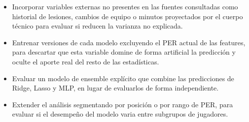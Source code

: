 \documentclass[11pt,a4paper]{article}
\begin{document}
\begin{itemize}[leftmargin=*, itemsep=4pt]
    \item Incorporar variables externas no presentes en las fuentes consultadas como historial de lesiones, cambios de equipo o minutos proyectados por el
    cuerpo técnico para evaluar si reducen la varianza no explicada.

    \item Entrenar versiones de cada modelo excluyendo el PER
    actual de las features, para descartar que esta variable domine de
    forma artificial la predicción y oculte el aporte real del resto
    de las estadísticas.

    \item Evaluar un modelo de ensemble explícito que
    combine las predicciones de Ridge, Lasso y MLP, en lugar de evaluarlos
    de forma independiente.

    \item Extender el análisis segmentando por posición o por rango
    de PER, para evaluar si el desempeño del modelo varia entre
    subgrupos de jugadores.
\end{itemize}
\end{document}
